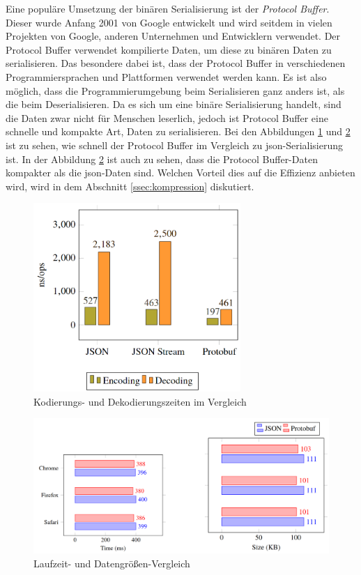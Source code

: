 Eine populäre Umsetzung der binären Serialisierung ist der \textit{Protocol Buffer}. Dieser wurde Anfang 2001 von Google entwickelt und wird seitdem in vielen Projekten von Google, anderen Unternehmen und Entwicklern verwendet. Der Protocol Buffer verwendet kompilierte Daten, um diese zu binären Daten zu serialisieren. Das besondere dabei ist, dass der Protocol Buffer in verschiedenen Programmiersprachen und Plattformen verwendet werden kann. Es ist also möglich, dass die Programmierumgebung beim Serialisieren ganz anders ist, als die beim Deserialisieren. Da es sich um eine binäre Serialisierung handelt, sind die Daten zwar nicht für Menschen leserlich, jedoch ist Protocol Buffer eine schnelle und kompakte Art, Daten zu serialisieren. Bei den Abbildungen \ref{fig:protobufTime} und \ref{fig:protobufBrowser} ist zu sehen, wie schnell der Protocol Buffer im Vergleich zu \ac{json}-Serialisierung ist.  In der Abbildung \ref{fig:protobufBrowser} ist auch zu sehen, dass die Protocol Buffer-Daten kompakter als die \ac{json}-Daten sind. Welchen Vorteil dies auf die Effizienz anbieten wird, wird in dem Abschnitt \ref{ssec:kompression} diskutiert.\cite{currier2022protocol}

\begin{figure}[htp]
    \centering
    \includegraphics[width=0.7\textwidth]{images/protobuf_time.png}
    \caption{Kodierungs- und Dekodierungszeiten im Vergleich\cite{currier2022protocol}}
    \label{fig:protobufTime}
\end{figure}

\begin{figure}[htp]
    \centering
    \includegraphics[width=1\textwidth]{images/protobuf_browser.png}
    \caption{Laufzeit- und Datengrößen-Vergleich\cite{currier2022protocol}}
    \label{fig:protobufBrowser}
\end{figure}

